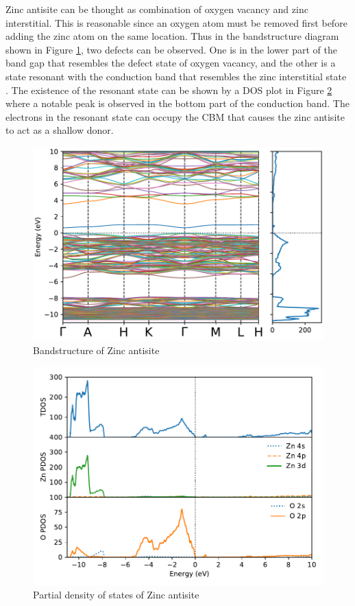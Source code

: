 Zinc antisite can be thought as combination of oxygen vacancy and zinc interstitial. This is reasonable since an oxygen atom must be removed first before adding the zinc atom on the same location.  Thus in the bandstructure diagram shown in Figure \ref{fig:bands.Zn-anti}, two defects can be observed. One is in the lower part of the band gap that resembles the defect state of oxygen vacancy, and the other is a state resonant with the conduction band that resembles the zinc interstitial state \citep{Janotti2007}. The existence of the resonant state can be shown by a DOS plot in Figure \ref{fig:dos.Zn-anti} where a notable peak is observed in the bottom part of the conduction band. The electrons in the resonant state can occupy the CBM that causes the zinc antisite to act as a shallow donor. 

\begin{figure}[tbh!]
	\centering
	\includegraphics[width=0.7\linewidth]{"images/rnd/band-dos_Zn_anti"}
	\caption[Bandstructure of Zinc antisite]{Bandstructure of Zinc antisite}
	\label{fig:bands.Zn-anti}
\end{figure}

\begin{figure}[tbh!]
	\centering
	\includegraphics[width=0.7\linewidth]{"images/rnd/dos-pdos_Zn_anti"}
	\caption[Partial density of states of Zinc antisite]{Partial density of states of Zinc antisite}
	\label{fig:dos.Zn-anti}
\end{figure}


